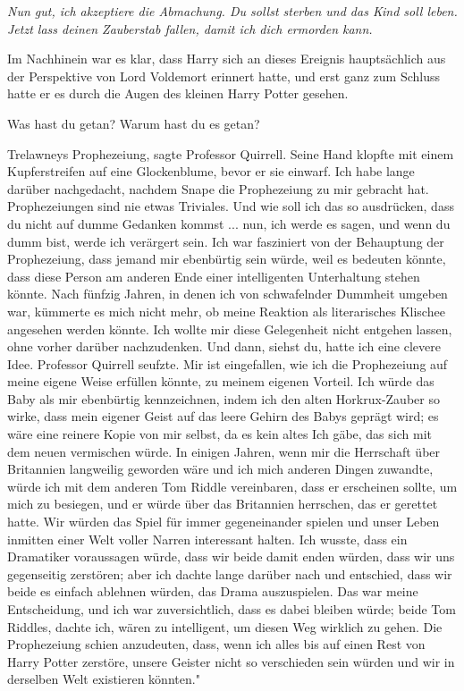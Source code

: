 \glqq \emph{Nun gut, ich akzeptiere die Abmachung. Du sollst sterben und das
Kind soll leben. Jetzt lass deinen Zauberstab fallen, damit ich dich ermorden
kann.}\grqq{}

Im Nachhinein war es klar, dass Harry sich an dieses Ereignis hauptsächlich aus
der Perspektive von Lord Voldemort erinnert hatte, und erst ganz zum Schluss
hatte er es durch die Augen des kleinen Harry Potter gesehen.

\glqq Was hast du getan? Warum hast du es getan?\grqq{}

\glqq Trelawneys Prophezeiung\grqq{}, sagte Professor Quirrell. Seine Hand
klopfte mit einem Kupferstreifen auf eine Glockenblume, bevor er sie einwarf.
\glqq Ich habe lange darüber nachgedacht, nachdem Snape die Prophezeiung zu mir
gebracht hat. Prophezeiungen sind nie etwas Triviales. Und wie soll ich das so
ausdrücken, dass du nicht auf dumme Gedanken kommst ... nun, ich werde es sagen,
und wenn du dumm bist, werde ich verärgert sein. Ich war fasziniert von der
Behauptung der Prophezeiung, dass jemand mir ebenbürtig sein würde, weil es
bedeuten könnte, dass diese Person am anderen Ende einer intelligenten
Unterhaltung stehen könnte. Nach fünfzig Jahren, in denen ich von schwafelnder
Dummheit umgeben war, kümmerte es mich nicht mehr, ob meine Reaktion als
literarisches Klischee angesehen werden könnte. Ich wollte mir diese Gelegenheit
nicht entgehen lassen, ohne vorher darüber nachzudenken. Und dann, siehst du,
hatte ich eine clevere Idee.\grqq{} Professor Quirrell seufzte. \glqq Mir ist
eingefallen, wie ich die Prophezeiung auf meine eigene Weise erfüllen könnte, zu
meinem eigenen Vorteil. Ich würde das Baby als mir ebenbürtig kennzeichnen,
indem ich den alten Horkrux-Zauber so wirke, dass mein eigener Geist auf das
leere Gehirn des Babys geprägt wird; es wäre eine reinere Kopie von mir selbst,
da es kein altes Ich gäbe, das sich mit dem neuen vermischen würde. In einigen
Jahren, wenn mir die Herrschaft über Britannien langweilig geworden wäre und ich
mich anderen Dingen zuwandte, würde ich mit dem anderen Tom Riddle vereinbaren,
dass er erscheinen sollte, um mich zu besiegen, und er würde über das Britannien
herrschen, das er gerettet hatte. Wir würden das Spiel für immer gegeneinander
spielen und unser Leben inmitten einer Welt voller Narren interessant halten.
Ich wusste, dass ein Dramatiker voraussagen würde, dass wir beide damit enden
würden, dass wir uns gegenseitig zerstören; aber ich dachte lange darüber nach
und entschied, dass wir beide es einfach ablehnen würden, das Drama
auszuspielen. Das war meine Entscheidung, und ich war zuversichtlich, dass es
dabei bleiben würde; beide Tom Riddles, dachte ich, wären zu intelligent, um
diesen Weg wirklich zu gehen. Die Prophezeiung schien anzudeuten, dass, wenn ich
alles bis auf einen Rest von Harry Potter zerstöre, unsere Geister nicht so
verschieden sein würden und wir in derselben Welt existieren könnten."

